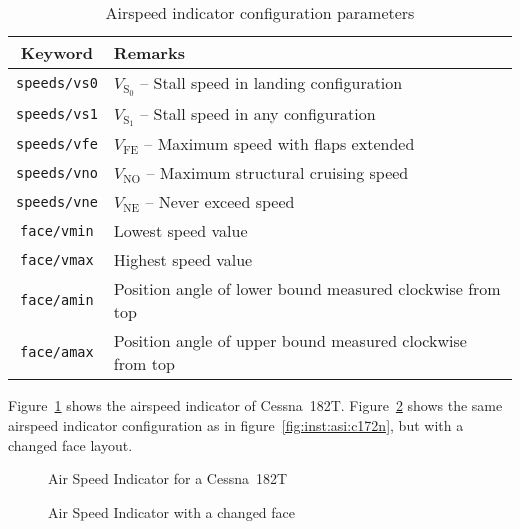 \begin{table}
\centering
\begin{tabular}{cl}
\toprule
Keyword             & Remarks                                                   \\
\midrule
\texttt{speeds/vs0} & $V_\mathrm{S_0}$ -- Stall speed in landing configuration  \\
\texttt{speeds/vs1} & $V_\mathrm{S_1}$ -- Stall speed in any configuration      \\
\texttt{speeds/vfe} & $V_\mathrm{FE}$  -- Maximum speed with flaps extended     \\
\texttt{speeds/vno} & $V_\mathrm{NO}$  -- Maximum structural cruising speed     \\
\texttt{speeds/vne} & $V_\mathrm{NE}$  -- Never exceed speed                    \\
\texttt{face/vmin}  & Lowest speed value                                        \\
\texttt{face/vmax}  & Highest speed value                                       \\
\texttt{face/amin}  & Position angle of lower bound measured clockwise from top \\
\texttt{face/amax}  & Position angle of upper bound measured clockwise from top \\
\bottomrule
\end{tabular}
\caption{Airspeed indicator configuration parameters}
\label{tab:inst:asi:config}
\end{table}

Figure~\ref{fig:inst:asi:c182t} shows the airspeed indicator of Cessna~182T.
Figure~\ref{fig:inst:asi:range} shows the same airspeed indicator configuration
as in figure~\ref{fig:inst:asi:c172n}, but with a changed face layout.

\begin{figure}[!h]
\centering
{}
\caption{Air Speed Indicator for a Cessna~182T}
\label{fig:inst:asi:c182t}
\end{figure}

\begin{figure}[!h]
\centering
{}
\caption{Air Speed Indicator with a changed face}
\label{fig:inst:asi:range}
\end{figure}
